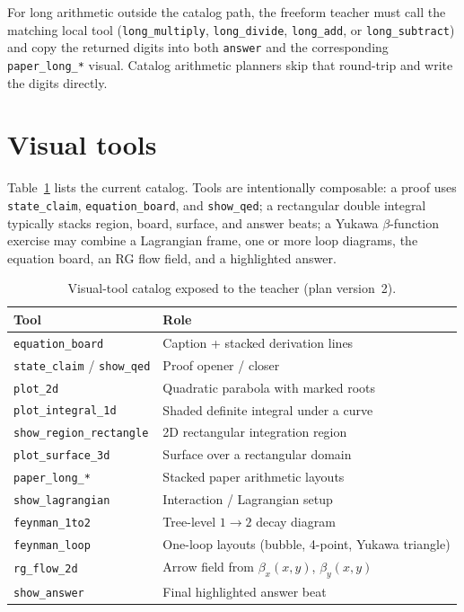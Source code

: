 \documentclass[11pt]{article}
\begin{document}
For long arithmetic outside the catalog path, the freeform teacher must call
the matching local tool (\texttt{long\_multiply}, \texttt{long\_divide},
\texttt{long\_add}, or \texttt{long\_subtract}) and copy the returned digits
into both \texttt{answer} and the corresponding \texttt{paper\_long\_*} visual.
Catalog arithmetic planners skip that round-trip and write the digits
directly.

\section{Visual tools}
\label{sec:tools}

Table~\ref{tab:tools} lists the current catalog. Tools are intentionally
composable: a proof uses \texttt{state\_claim}, \texttt{equation\_board}, and
\texttt{show\_qed}; a rectangular double integral typically stacks region,
board, surface, and answer beats; a Yukawa $\beta$-function exercise may
combine a Lagrangian frame, one or more loop diagrams, the equation board,
an RG flow field, and a highlighted answer.

\begin{table}[H]
\centering
\caption{Visual-tool catalog exposed to the teacher (plan version~2).}
\label{tab:tools}
\begin{tabular}{@{}ll@{}}
\toprule
Tool & Role \\
\midrule
\texttt{equation\_board} & Caption + stacked derivation lines \\
\texttt{state\_claim} / \texttt{show\_qed} & Proof opener / closer \\
\texttt{plot\_2d} & Quadratic parabola with marked roots \\
\texttt{plot\_integral\_1d} & Shaded definite integral under a curve \\
\texttt{show\_region\_rectangle} & 2D rectangular integration region \\
\texttt{plot\_surface\_3d} & Surface over a rectangular domain \\
\texttt{paper\_long\_*} & Stacked paper arithmetic layouts \\
\texttt{show\_lagrangian} & Interaction / Lagrangian setup \\
\texttt{feynman\_1to2} & Tree-level $1\to 2$ decay diagram \\
\texttt{feynman\_loop} & One-loop layouts (bubble, 4-point, Yukawa triangle) \\
\texttt{rg\_flow\_2d} & Arrow field from $\beta_x(x,y)$, $\beta_y(x,y)$ \\
\texttt{show\_answer} & Final highlighted answer beat \\
\bottomrule
\end{tabular}
\end{table}
\end{document}

